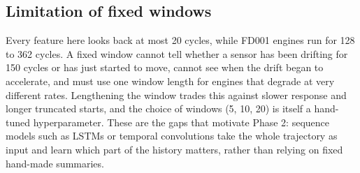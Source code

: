 \subsection{Limitation of fixed windows}
Every feature here looks back at most 20 cycles, while FD001 engines run
for 128 to 362 cycles. A fixed window cannot tell whether a sensor has been
drifting for 150 cycles or has just started to move, cannot see when the
drift began to accelerate, and must use one window length for engines that
degrade at very different rates. Lengthening the window trades this
against slower response and longer truncated starts, and the choice of
windows (5, 10, 20) is itself a hand-tuned hyperparameter. These are the
gaps that motivate Phase 2: sequence models such as LSTMs or temporal
convolutions take the whole trajectory as input and learn which part of
the history matters, rather than relying on fixed hand-made summaries.
